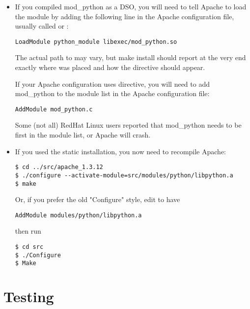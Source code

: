 \begin{itemize}

\item
If you compiled mod_python as a DSO, you will need to tell Apache to
load the module by adding the following line in the Apache
configuration file, usually called  or
:

\begin{verbatim}
LoadModule python_module libexec/mod_python.so
\end{verbatim}

The actual path to  may vary, but make install
should report at the very end exactly where 
was placed and how the  directive should appear.

If your Apache configuration uses  directive,
you will need to add mod_python to the module list in the Apache
configuration file:

\begin{verbatim}
AddModule mod_python.c
\end{verbatim}

Some (not all) RedHat Linux users reported that mod_python needs to be
first in the module list, or Apache will crash.

\item
If you used the static installation, you now need to recompile Apache: 

\begin{verbatim}
$ cd ../src/apache_1.3.12
$ ./configure --activate-module=src/modules/python/libpython.a
$ make
\end{verbatim}
                            
Or, if you prefer the old "Configure" style, edit
 to have

\begin{verbatim}
AddModule modules/python/libpython.a
\end{verbatim}
then run 
\begin{verbatim}
$ cd src
$ ./Configure
$ Make
\end{verbatim}

\end{itemize}

\section{Testing\label{inst-testing}}

